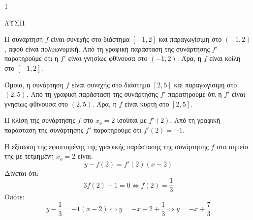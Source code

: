 \begin{ylh}{1}
    \item [Ύλη από εικόνα]
\end{ylh}
ΛΥΣΗ
\begin{alist}
\item Η συνάρτηση $f$ είναι συνεχής στο διάστημα $[-1,2]$ και παραγωγίσιμη στο $(-1,2)$, αφού είναι πολυωνυμική. Από τη γραφική παράσταση της συνάρτησης $f'$ παρατηρούμε ότι η $f'$ είναι γνησίως φθίνουσα στο $(-1,2)$. Άρα, η $f$ είναι κοίλη στο $[-1,2]$.

Όμοια, η συνάρτηση $f$ είναι συνεχής στο διάστημα $[2,5]$ και παραγωγίσιμη στο $(2,5)$. Από τη γραφική παράσταση της συνάρτησης $f'$ παρατηρούμε ότι η $f'$ είναι γνησίως φθίνουσα στο $(2,5)$. Άρα, η $f$ είναι κυρτή στο $[2,5]$.
\item Η κλίση της συνάρτησης $f$ στο $x_o = 2$ ισούται με $f'(2)$. Από τη γραφική παράσταση της συνάρτησης $f'$ παρατηρούμε ότι $f'(2) = -1$.
\item Η εξίσωση της εφαπτομένης της γραφικής παράστασης της συνάρτησης $f$ στο σημείο της με τετμημένη $x_o = 2$ είναι:
\[ y - f(2) = f'(2)(x - 2) \]
Δίνεται ότι:
\[ 3f(2) - 1 = 0 \Leftrightarrow f(2) = \frac{1}{3} \]
Οπότε:
\[ y - \frac{1}{3} = -1(x - 2) \Leftrightarrow y = -x + 2 + \frac{1}{3} \Leftrightarrow y = -x + \frac{7}{3} \]
\end{alist}